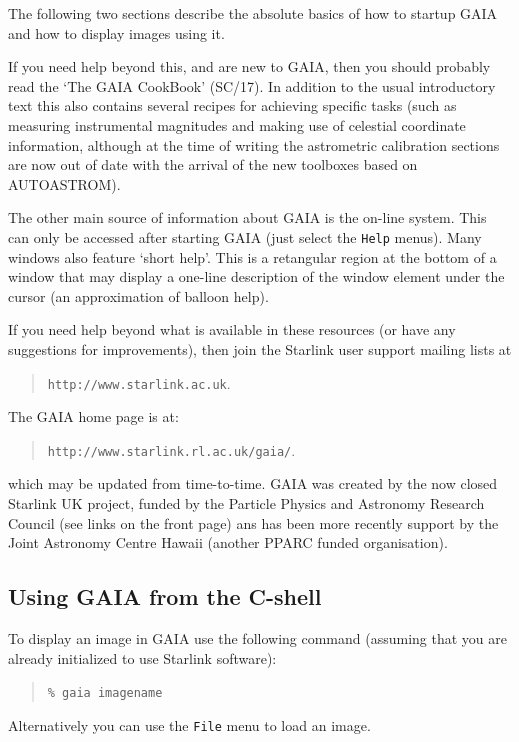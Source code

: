 \documentclass[twoside,11pt]{article}
\newcommand{\htmladdnormallink}[2]{#1}
\newcommand{\xref}[3]{#1}
\newcommand{\xlabel}[1]{}
\renewcommand{\_}{\texttt{\symbol{95}}}
\newcommand{\mytt}[1]{{\texttt{#1}}}
\begin{document}
The following two sections describe the absolute basics of how to
startup GAIA and how to display images using it.

If you need help beyond this, and are new to GAIA, then you should probably
read the `The GAIA CookBook' (\xref{SC/17}{sc17}{}). In addition to the usual
introductory text this also contains several recipes for achieving specific
tasks (such as measuring instrumental magnitudes and making use of celestial
coordinate information, although at the time of writing the astrometric
calibration sections are now out of date with the arrival of the new toolboxes
based on AUTOASTROM).

The other main source of information about GAIA is the on-line
system. This can only be accessed after starting GAIA (just select the
\mytt{Help} menus). Many windows also feature `short help'. This is a
retangular region at the bottom of a window that may display a
one-line description of the window element under the cursor (an
approximation of balloon help).

If you need help beyond what is available in these resources (or have
any suggestions for improvements), then join the Starlink user support
mailing lists at
\begin{quote}
\htmladdnormallink{\mytt{http://www.starlink.ac.uk}}{http://www.starlink.ac.uk}.
\end{quote}
The GAIA home page is at:
\begin{quote}
\htmladdnormallink{\mytt{http://www.starlink.rl.ac.uk/gaia/}}{http://www.starlink.rl.ac.uk/gaia/}.
\end{quote}
which may be updated from time-to-time. GAIA was created by the now
closed Starlink UK project, funded by the Particle Physics and Astronomy Research
Council (see links on the front page) ans has been more recently support by
the Joint Astronomy Centre Hawaii (another PPARC funded organisation).

\subsection{\xlabel{using_gaia_from_the_cshell}Using GAIA from the C-shell}

To display an image in GAIA use the following command
(assuming that you are already initialized to use Starlink software):
\begin{quote}
\mytt{\% gaia image\_name}
\end{quote}
Alternatively you can use the \mytt{File} menu to load an image.
\end{document}
